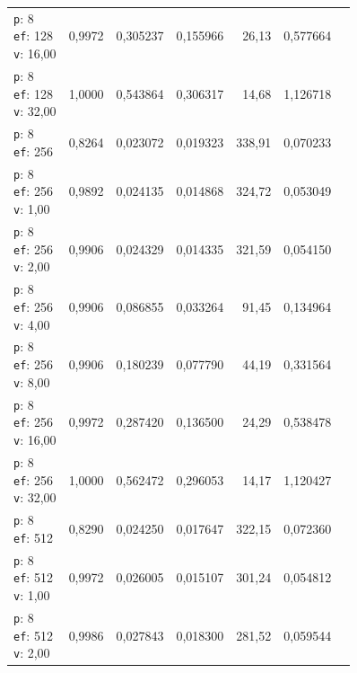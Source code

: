 \begin{table}[htbp]
\begin{tabularx}{\textwidth}{Xrrrrrr}
    \makecell{\texttt{p}: 8\\\texttt{ef}: 128\\\texttt{v}: 16,00} & 0,9972 & 0,305237 & 0,155966 & 26,13 & 0,577664 \\
    \makecell{\texttt{p}: 8\\\texttt{ef}: 128\\\texttt{v}: 32,00} & 1,0000 & 0,543864 & 0,306317 & 14,68 & 1,126718 \\
    \makecell{\texttt{p}: 8\\\texttt{ef}: 256} & 0,8264 & 0,023072 & 0,019323 & 338,91 & 0,070233 \\
    \makecell{\texttt{p}: 8\\\texttt{ef}: 256\\\texttt{v}: 1,00} & 0,9892 & 0,024135 & 0,014868 & 324,72 & 0,053049 \\
    \makecell{\texttt{p}: 8\\\texttt{ef}: 256\\\texttt{v}: 2,00} & 0,9906 & 0,024329 & 0,014335 & 321,59 & 0,054150 \\
    \makecell{\texttt{p}: 8\\\texttt{ef}: 256\\\texttt{v}: 4,00} & 0,9906 & 0,086855 & 0,033264 & 91,45 & 0,134964 \\
    \makecell{\texttt{p}: 8\\\texttt{ef}: 256\\\texttt{v}: 8,00} & 0,9906 & 0,180239 & 0,077790 & 44,19 & 0,331564 \\
    \makecell{\texttt{p}: 8\\\texttt{ef}: 256\\\texttt{v}: 16,00} & 0,9972 & 0,287420 & 0,136500 & 24,29 & 0,538478 \\
    \makecell{\texttt{p}: 8\\\texttt{ef}: 256\\\texttt{v}: 32,00} & 1,0000 & 0,562472 & 0,296053 & 14,17 & 1,120427 \\
    \makecell{\texttt{p}: 8\\\texttt{ef}: 512} & 0,8290 & 0,024250 & 0,017647 & 322,15 & 0,072360 \\
    \makecell{\texttt{p}: 8\\\texttt{ef}: 512\\\texttt{v}: 1,00} & 0,9972 & 0,026005 & 0,015107 & 301,24 & 0,054812 \\
    \makecell{\texttt{p}: 8\\\texttt{ef}: 512\\\texttt{v}: 2,00} & 0,9986 & 0,027843 & 0,018300 & 281,52 & 0,059544 \\

\end{tabularx}
\end{table}
